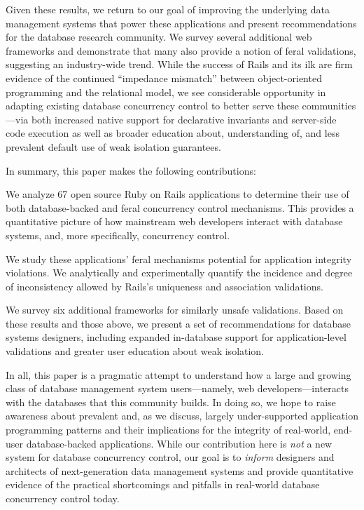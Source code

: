 Given these results, we return to our goal of improving the underlying
data management systems that power these applications and present
recommendations for the database research community. We survey several
additional web frameworks and demonstrate that many also provide a
notion of feral validations, suggesting an industry-wide trend. While
the success of Rails and its ilk are firm evidence of the continued
``impedance mismatch'' between object-oriented programming and the
relational model, we see considerable opportunity in adapting existing
database concurrency control to better serve these communities---via
both increased native support for declarative invariants and
server-side code execution as well as broader education about,
understanding of, and less prevalent default use of weak isolation
guarantees.

In summary, this paper makes the following contributions:
\begin{myitemize}
\item We analyze 67 open source Ruby on Rails applications to
  determine their use of both database-backed and feral concurrency
  control mechanisms. This provides a quantitative picture of how
  mainstream web developers interact with database systems, and, more
  specifically, concurrency control.

\item We study these applications' feral mechanisms potential for
  application integrity violations. We analytically and experimentally
  quantify the incidence and degree of inconsistency allowed by
  Rails's uniqueness and association validations.

\item We survey six additional frameworks for similarly unsafe
  validations. Based on these results and those above, we present a
  set of recommendations for database systems designers, including
  expanded in-database support for application-level validations and
  greater user education about weak isolation.
\end{myitemize}

In all, this paper is a pragmatic attempt to understand how a large
and growing class of database management system users---namely, web
developers---interacts with the databases that this community
builds. In doing so, we hope to raise awareness about prevalent and,
as we discuss, largely under-supported application programming patterns
and their implications for the integrity of real-world, end-user
database-backed applications. While our contribution here is
\textit{not} a new system for database concurrency control, our goal
is to \textit{inform} designers and architects of next-generation data
management systems and provide quantitative evidence of the practical
shortcomings and pitfalls in real-world database concurrency control
today.


